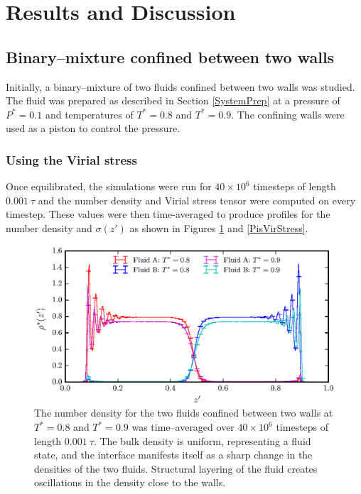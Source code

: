 \section{Results and Discussion}
\subsection{Binary--mixture confined between two walls}\label{Piston}
Initially, a binary--mixture of two fluids confined between two walls was studied. 
The fluid was prepared as described in Section \ref{SystemPrep} at a pressure of $P^{*} = 0.1$ and temperatures of $T^{*} = 0.8$ and $T^{*} = 0.9$.
The confining walls were used as a piston to control the pressure.

\subsubsection{Using the Virial stress}\label{VirialStressPiston}
Once equilibrated, the simulations were run for $40 \times 10^{6}$ timesteps of length $0.001\ \tau$ and the number density and Virial stress tensor were computed on every timestep.
These values were then time-averaged to produce profiles for the number density and $\sigma(z')$ as shown in Figures \ref{PisVirRho} and \ref{PisVirStress}. 

\FloatBarrier
\begin{figure}[h!]
\centering
\includegraphics[scale=1.0]{PisVirRho}
\caption{The number density for the two fluids confined between two walls at $T^{*} = 0.8$ and $T^{*} = 0.9$ was time--averaged over $40 \times 10^{6}$ timesteps of length $0.001\ \tau$. 
The bulk density is uniform, representing a fluid state, and the interface manifests itself as a sharp change in the densities of the two fluids.
Structural layering of the fluid creates oscillations in the density close to the walls.
}
\label{PisVirRho}
\end{figure}

